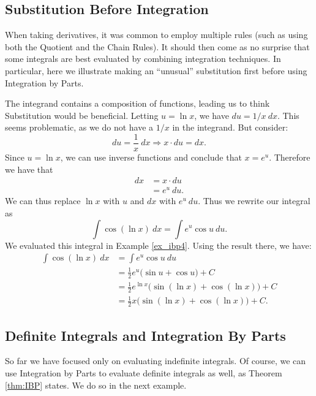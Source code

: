 \subsection*{Substitution Before Integration}

When taking derivatives, it was common to employ multiple rules (such as using both the Quotient and the Chain Rules). It should then come as no surprise that some integrals are best evaluated by combining integration techniques. In particular, here we illustrate making an ``unusual'' substitution first before using Integration by Parts.

{The integrand contains a composition of functions, leading us to think Substitution would be beneficial. Letting $u=\ln x$, we have $du = 1/x\ dx$. This seems problematic, as we do not have a $1/x$ in the integrand. But consider:
$$du = \frac 1x\ dx \Rightarrow x\cdot du = dx.$$
Since $u = \ln x$, we can use inverse functions and conclude that $x = e^u$. Therefore we have that
\begin{align*}
dx &= x\cdot du \\
		&= e^u\ du.
\end{align*}
We can thus replace $\ln x$ with $u$ and $dx$ with $e^u\ du$. Thus we rewrite our integral as 
$$\int \cos(\ln x)\ dx = \int e^u\cos u \ du.$$
We evaluated this integral in Example \ref{ex_ibp4}. Using the result there, we have:
\begin{align*}
\int \cos(\ln x)\ dx &= \int e^u\cos u \ du \\
				&= \frac12e^u\big(\sin u + \cos u\big) + C \\
				&= \frac12e^{\ln x} \big(\sin(\ln x) + \cos (\ln x)\big)+C\\
				&= \frac12x \big(\sin(\ln x) + \cos (\ln x)\big)+C.
\end{align*}}

\subsection*{Definite Integrals and Integration By Parts}

So far we have focused only on evaluating indefinite integrals. Of course, we can use Integration by Parts to evaluate definite integrals as well, as Theorem \ref{thm:IBP} states. We do so in the next example.

